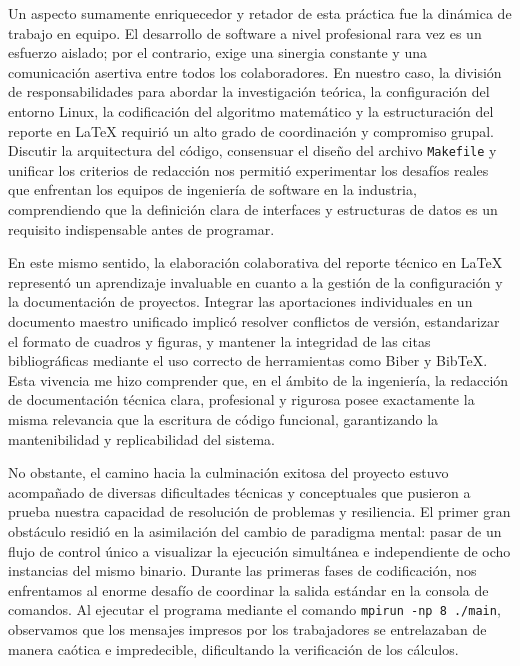 Un aspecto sumamente enriquecedor y retador de esta práctica fue la dinámica de trabajo en equipo. El desarrollo de software a nivel profesional rara vez es un esfuerzo aislado; por el contrario, exige una sinergia constante y una comunicación asertiva entre todos los colaboradores. En nuestro caso, la división de responsabilidades para abordar la investigación teórica, la configuración del entorno Linux, la codificación del algoritmo matemático y la estructuración del reporte en LaTeX requirió un alto grado de coordinación y compromiso grupal. Discutir la arquitectura del código, consensuar el diseño del archivo \texttt{Makefile} y unificar los criterios de redacción nos permitió experimentar los desafíos reales que enfrentan los equipos de ingeniería de software en la industria, comprendiendo que la definición clara de interfaces y estructuras de datos es un requisito indispensable antes de programar.

En este mismo sentido, la elaboración colaborativa del reporte técnico en LaTeX representó un aprendizaje invaluable en cuanto a la gestión de la configuración y la documentación de proyectos. Integrar las aportaciones individuales en un documento maestro unificado implicó resolver conflictos de versión, estandarizar el formato de cuadros y figuras, y mantener la integridad de las citas bibliográficas mediante el uso correcto de herramientas como Biber y BibTeX. Esta vivencia me hizo comprender que, en el ámbito de la ingeniería, la redacción de documentación técnica clara, profesional y rigurosa posee exactamente la misma relevancia que la escritura de código funcional, garantizando la mantenibilidad y replicabilidad del sistema.

No obstante, el camino hacia la culminación exitosa del proyecto estuvo acompañado de diversas dificultades técnicas y conceptuales que pusieron a prueba nuestra capacidad de resolución de problemas y resiliencia. El primer gran obstáculo residió en la asimilación del cambio de paradigma mental: pasar de un flujo de control único a visualizar la ejecución simultánea e independiente de ocho instancias del mismo binario. Durante las primeras fases de codificación, nos enfrentamos al enorme desafío de coordinar la salida estándar en la consola de comandos. Al ejecutar el programa mediante el comando \texttt{mpirun -np 8 ./main}, observamos que los mensajes impresos por los trabajadores se entrelazaban de manera caótica e impredecible, dificultando la verificación de los cálculos.

